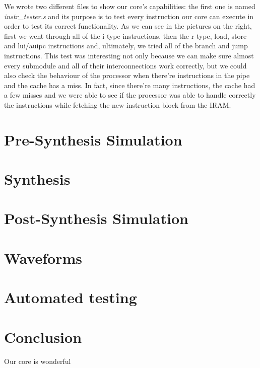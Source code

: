 \documentclass[10pt,  english, makeidx, a4paper, titlepage, oneside]{book}
\begin{document}
We wrote two different files to show our core's capabilities: the first one is named \textit{instr\_tester.s} and its purpose is to test every instruction our core can execute in order to test its correct functionality. As we can see in the pictures on the right, first we went through all of the i-type instructions, then the r-type, load, store and lui/auipc instructions and, ultimately, we tried all of the branch and jump instructions. This test was interesting not only because we can make sure almost every submodule and all of their interconnections work correctly, but we could also check the behaviour of the processor when there're instructions in the pipe and the cache has a miss. In fact, since there're many instructions, the cache had a few misses and we were able to see if the processor was able to handle correctly the instructions while fetching the new instruction block from the IRAM.


\newpage
\section{Pre-Synthesis Simulation}


\section{Synthesis}


\section{Post-Synthesis Simulation}

\section{Waveforms}
\section{Automated testing}

\section*{Conclusion}
Our core is wonderful
\end{document}
